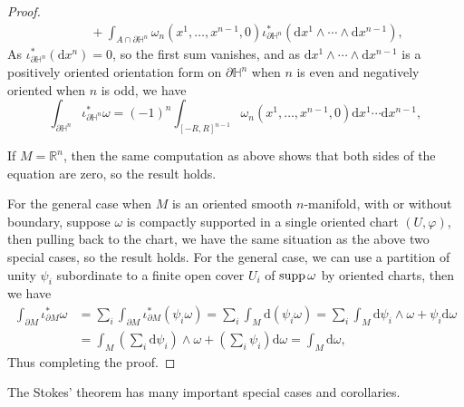 \documentclass[../main.tex]{subfiles}
\begin{document}
\begin{proof}
\begin{equation*}
\begin{aligned}
      & \quad + \int_{A\cap \partial \mathbb{H}^n} \omega_n(x^1, \ldots , x^{n-1}, 0) \iota^*_{\partial \mathbb{H}^n} (\mathrm{d} x^1 \wedge \cdots \wedge \mathrm{d} x^{n-1}),
    \end{aligned}
  \end{equation*}
  As $\iota^*_{\partial \mathbb{H}^n} (\mathrm{d} x^n) = 0$, so the first sum vanishes, and as $\mathrm{d} x^1 \wedge \cdots \wedge \mathrm{d} x^{n-1}$ is a positively oriented orientation form on $\partial \mathbb{H}^n$ when $n$ is even and negatively oriented when $n$ is odd, we have
  \begin{equation*}
    \int_{\partial \mathbb{H}^n} \iota^*_{\partial \mathbb{H}^n} \omega = (-1)^n \int_{[-R,R]^{n-1}} \omega_n(x^1, \ldots , x^{n-1}, 0) \mathrm{d}x^1\cdots \mathrm{d}x^{n-1},
  \end{equation*}

  If $M = \mathbb{R}^n$, then the same computation as above shows that both sides of the equation are zero, so the result holds.

  For the general case when $M$ is an oriented smooth $n$-manifold, with or without boundary, suppose $\omega$ is compactly supported in a single oriented chart $(U,\varphi)$, then pulling back to the chart, we have the same situation as the above two special cases, so the result holds. For the general case, we can use a partition of unity $\psi_i$ subordinate to a finite open cover $U_i$ of $\operatorname{supp} \omega$ by oriented charts, then we have
  \begin{equation*}
    \begin{aligned}
      \int_{\partial M} \iota^*_{\partial M} \omega &= \sum_i \int_{\partial M} \iota^*_{\partial M} (\psi_i \omega) = \sum_i \int_M \mathrm{d} (\psi_i \omega) = \sum_i \int_M \mathrm{d} \psi_i \wedge \omega + \psi_i \mathrm{d} \omega\\
      &= \int_M \left( \sum_i \mathrm{d} \psi_i \right) \wedge \omega + \left( \sum_i \psi_i \right) \mathrm{d} \omega = \int_M \mathrm{d} \omega,
    \end{aligned}
  \end{equation*}
  Thus completing the proof.
\end{proof}

The Stokes' theorem has many important special cases and corollaries.
\end{document}
